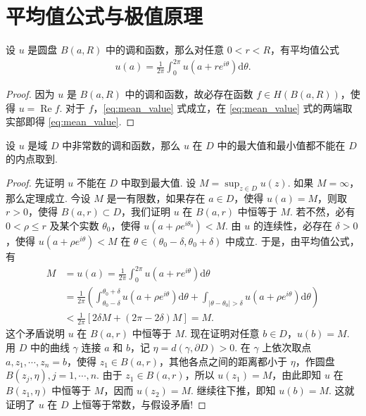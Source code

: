 \documentclass[../../main.tex]{subfiles}%
\begin{document}
\section{平均值公式与极值原理}

\begin{theorem}[平均值公式]\label{theorem:平均值公式}
设 \(u\) 是圆盘 \(B(a,R)\) 中的调和函数，那么对任意 \(0<r<R\)，有平均值公式
\begin{align}
u(a) = \frac{1}{2\pi} \int_{0}^{2\pi} u(a+re^{i\theta})\mathrm{d}\theta. \label{eq:mean_value}
\end{align}
\end{theorem}
\begin{proof}
因为 \(u\) 是 \(B(a,R)\) 中的调和函数，故必存在函数 \(f \in H(B(a,R))\)，使得 \(u=\operatorname{Re} f\). 对于 \(f\)，\eqref{eq:mean_value} 式成立，在 \eqref{eq:mean_value} 式的两端取实部即得 \eqref{eq:mean_value}.
\end{proof}

\begin{theorem}\label{theorem:extremum}
设 \(u\) 是域 \(D\) 中非常数的调和函数，那么 \(u\) 在 \(D\) 中的最大值和最小值都不能在 \(D\) 的内点取到.
\end{theorem}
\begin{proof}
先证明 \(u\) 不能在 \(D\) 中取到最大值. 设 \(M = \sup_{z\in D} u(z)\). 如果 \(M = \infty\)，那么定理成立. 今设 \(M\) 是一有限数，如果存在 \(a \in D\)，使得 \(u(a)=M\)，则取 \(r>0\)，使得 \(B(a,r) \subset D\)，我们证明 \(u\) 在 \(B(a,r)\) 中恒等于 \(M\). 若不然，必有 \(0 < \rho \leqslant r\) 及某个实数 \(\theta_0\)，使得 \(u(a+\rho e^{i\theta_0}) < M\). 由 \(u\) 的连续性，必存在 \(\delta > 0\)，使得 \(u(a+\rho e^{i\theta}) < M\) 在 \(\theta \in (\theta_0-\delta,\theta_0+\delta)\) 中成立. 于是，由平均值公式，有
\begin{align*} M &= u(a) = \frac{1}{2\pi} \int_{0}^{2\pi} u(a+re^{i\theta}) \mathrm{d}\theta \\ &= \frac{1}{2\pi} \left( \int_{\theta_0-\delta}^{\theta_0+\delta} u(a+\rho e^{i\theta}) \mathrm{d}\theta + \int_{|\theta-\theta_0| > \delta} u(a+\rho e^{i\theta}) \mathrm{d}\theta \right) \\ &< \frac{1}{2\pi} [2\delta M + (2\pi - 2\delta)M] = M. 
\end{align*}
这个矛盾说明 \(u\) 在 \(B(a,r)\) 中恒等于 \(M\). 现在证明对任意 \(b \in D\)，\(u(b)=M\). 用 \(D\) 中的曲线 \(\gamma\) 连接 \(a\) 和 \(b\)，记 \(\eta = d(\gamma,\partial D) > 0\). 在 \(\gamma\) 上依次取点 \(a,z_1,\cdots,z_n=b\)，使得 \(z_1 \in B(a,r)\)，其他各点之间的距离都小于 \(\eta\)，作圆盘 \(B(z_j,\eta), j = 1,\cdots,n\). 由于 \(z_1 \in B(a,r)\)，所以 \(u(z_1) = M\)，由此即知 \(u\) 在 \(B(z_1,\eta)\) 中恒等于 \(M\)，因而 \(u(z_2) = M\). 继续往下推，即知 \(u(b)=M\). 这就证明了 \(u\) 在 \(D\) 上恒等于常数，与假设矛盾!
\end{proof}
\end{document}
